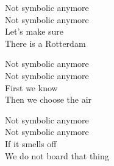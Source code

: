 \begin{lyrics}
Not symbolic anymore\\
Not symbolic anymore\\
Let’s make sure\\
There is a Rotterdam

Not symbolic anymore\\
Not symbolic anymore\\
First we know\\
Then we choose the air

Not symbolic anymore\\
Not symbolic anymore\\
If it smells off\\
We do not board that thing
\end{lyrics}

